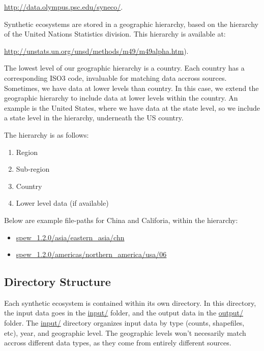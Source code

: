\documentclass{article}
\begin{document}
	\vspace{2mm}
	\url{http://data.olympus.psc.edu/syneco/}. 
	\vspace{2mm}

Synthetic ecosystems are stored in a geographic hierarchy, based on the hierarchy of the United Nations Statistics division. This hierarchy is available at: 
	
	\vspace{2mm}
	\url{http://unstats.un.org/unsd/methods/m49/m49alpha.htm}). 
	\vspace{2mm}

The lowest level of our geographic hierarchy is a country. Each country has a corresponding ISO3 code, invaluable for matching data accross sources. Sometimes, we have data at lower levels than country. In this case, we extend the geographic hierarchy to include data at lower levels within the country. An example is the United States, where we have data at the state level, so we include a state level in the hierarchy, underneath the US country.

The hierarchy is as follows:

\begin{enumerate}
	\item Region
	\item Sub-region 
	\item Country
	\item Lower level data (if available)
\end{enumerate}

Below are example file-paths for China and Califoria, within the hierarchy:

\begin{itemize}
	\item \url{spew_1.2.0/asia/eastern_asia/chn}
	\item \url{spew_1.2.0/americas/northern_america/usa/06}
\end{itemize}

\subsection{Directory Structure}
Each synthetic ecosystem is contained within its own directory. In this directory, the input data goes in the \url{input/} folder, and the output data in the \url{output/} folder. The \url{input/} directory organizes input data by type (counts, shapefiles, etc), year, and geographic level. The geographic levels won't necesarily match accross different data types, as they come from entirely different sources. 
\end{document}

